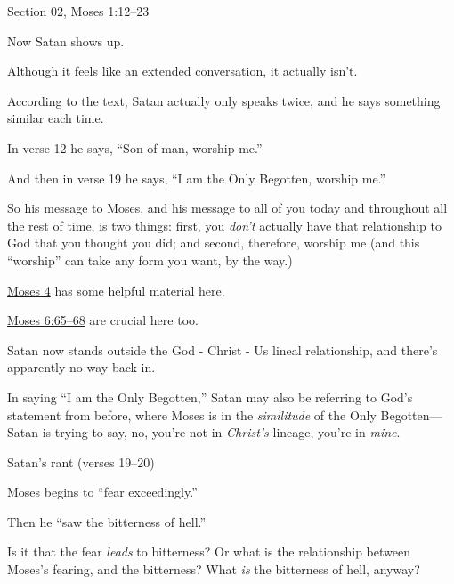 \begin{compactitem}
			\item Section 02, Moses 1:12--23
				\begin{compactitem}
					\item Now Satan shows up.
						\begin{compactitem}
							\item Although it feels like an extended conversation, it actually isn't. 
							\item According to the text, Satan actually only speaks twice, and he says something similar each time.
							\item In verse 12 he says, ``Son of man, worship me.''
							\item And then in verse 19 he says, ``I am the Only Begotten, worship me.''
							\item So his message to Moses, and his message to all of you today and throughout all the rest of time, is two things: first, you \textit{don't} actually have that relationship to God that you thought you did; and second, therefore, worship me (and this ``worship'' can take any form you want, by the way.)
							\item {}
								\begin{compactitem}
									\item \hyperref[MOSES-4]{Moses 4} has some helpful material here.
									\item \hyperref[MOSES-6-65]{Moses 6:65--68} are crucial here too.
									\item Satan now stands outside the God - Christ - Us lineal relationship, and there's apparently no way back in.
								\end{compactitem}
							\item In saying ``I am the Only Begotten,'' Satan may also be referring to God's statement from before, where Moses is in the \textit{similitude} of the Only Begotten---Satan is trying to say, no, you're not in \textit{Christ's} lineage, you're in \textit{mine}.
						\end{compactitem}
					\item Satan's rant (verses 19--20)
						\begin{compactitem}
							\item Moses begins to ``fear exceedingly.''
							\item Then he ``saw the bitterness of hell.''
							\item Is it that the fear \textit{leads} to bitterness? Or what is the relationship between Moses's fearing, and the bitterness? What \textit{is} the bitterness of hell, anyway?

\end{compactitem}
\end{compactitem}
\end{compactitem}
